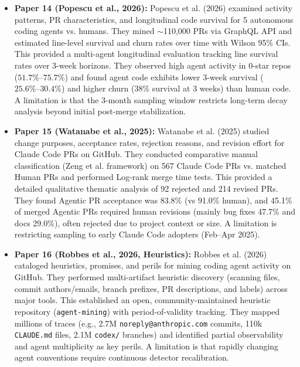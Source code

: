 \documentclass[11pt,a4paper]{article}
\begin{document}
\begin{itemize}[leftmargin=1.5em, itemsep=8pt]
    \item \textbf{Paper 14 (Popescu et al., 2026):}
    Popescu et al. (2026) examined activity patterns, PR characteristics, and longitudinal code survival for 5 autonomous coding agents vs. humans. They mined $\sim$110,000 PRs via GraphQL API and estimated line-level survival and churn rates over time with Wilson 95\% CIs. This provided a multi-agent longitudinal evaluation tracking line survival rates over 3-week horizons. They observed high agent activity in 0-star repos ($51.7\%\text{--}75.7\%$) and found agent code exhibits lower 3-week survival ($25.6\%\text{--}30.4\%$) and higher churn ($38\%$ survival at 3 weeks) than human code. A limitation is that the 3-month sampling window restricts long-term decay analysis beyond initial post-merge stabilization.

    \item \textbf{Paper 15 (Watanabe et al., 2025):}
    Watanabe et al. (2025) studied change purposes, acceptance rates, rejection reasons, and revision effort for Claude Code PRs on GitHub. They conducted comparative manual classification (Zeng et al. framework) on 567 Claude Code PRs vs. matched Human PRs and performed Log-rank merge time tests. This provided a detailed qualitative thematic analysis of 92 rejected and 214 revised PRs. They found Agentic PR acceptance was 83.8\% (vs 91.0\% human), and 45.1\% of merged Agentic PRs required human revisions (mainly bug fixes 47.7\% and docs 29.0\%), often rejected due to project context or size. A limitation is restricting sampling to early Claude Code adopters (Feb--Apr 2025).

    \item \textbf{Paper 16 (Robbes et al., 2026, Heuristics):}
    Robbes et al. (2026) cataloged heuristics, promises, and perils for mining coding agent activity on GitHub. They performed multi-artifact heuristic discovery (scanning files, commit authors/emails, branch prefixes, PR descriptions, and labels) across major tools. This established an open, community-maintained heuristic repository (\texttt{agent-mining}) with period-of-validity tracking. They mapped millions of traces (e.g., 2.7M \texttt{noreply@anthropic.com} commits, 110k \texttt{CLAUDE.md} files, 2.1M \texttt{codex/} branches) and identified partial observability and agent multiplicity as key perils. A limitation is that rapidly changing agent conventions require continuous detector recalibration.


\end{itemize}
\end{document}
